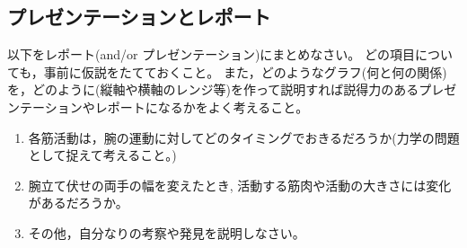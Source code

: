 \documentclass{jsarticle}
\begin{document}
\subsection{プレゼンテーションとレポート}

以下をレポート(and/or プレゼンテーション)にまとめなさい。
どの項目についても，事前に仮説をたてておくこと。
また，どのようなグラフ(何と何の関係)を，どのように(縦軸や横軸のレンジ等)を作って説明すれば説得力のあるプレゼンテーションやレポートになるかをよく考えること。


\begin{enumerate}
  \item 各筋活動は，腕の運動に対してどのタイミングでおきるだろうか(力学の問題として捉えて考えること。)
  \item 腕立て伏せの両手の幅を変えたとき, 活動する筋肉や活動の大きさには変化があるだろうか。
  \item その他，自分なりの考察や発見を説明しなさい。
\end{enumerate}
\end{document}
